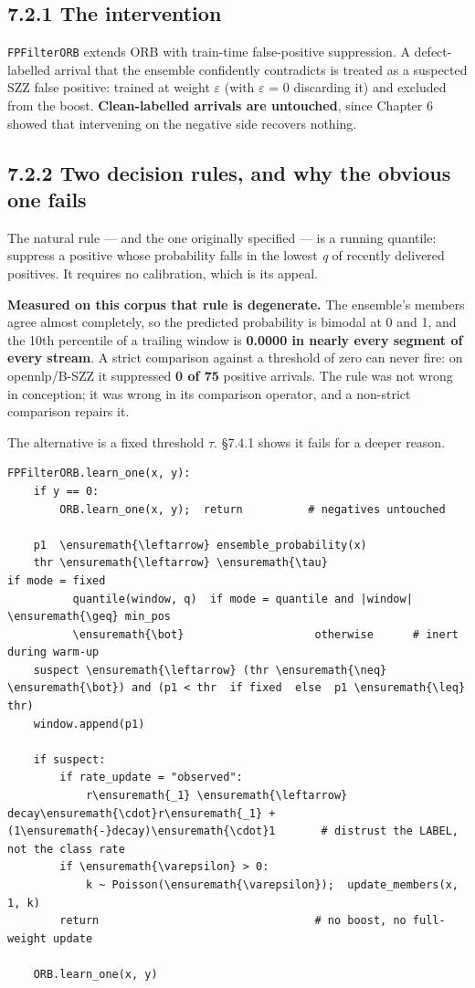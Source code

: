 \subsection{7.2.1 The intervention}\label{the-intervention}

\texttt{FPFilterORB} extends ORB with train-time false-positive
suppression. A defect-labelled arrival that the ensemble confidently
contradicts is treated as a suspected SZZ false positive: trained at
weight \ensuremath{\varepsilon} (with \ensuremath{\varepsilon} = 0 discarding it) and excluded from the boost.
\textbf{Clean-labelled arrivals are untouched}, since Chapter 6 showed
that intervening on the negative side recovers nothing.

\subsection{7.2.2 Two decision rules, and why the obvious one
fails}\label{two-decision-rules-and-why-the-obvious-one-fails}

The natural rule --- and the one originally specified --- is a running
quantile: suppress a positive whose probability falls in the lowest
\emph{q} of recently delivered positives. It requires no calibration,
which is its appeal.

\textbf{Measured on this corpus that rule is degenerate.} The ensemble's
members agree almost completely, so the predicted probability is bimodal
at 0 and 1, and the 10th percentile of a trailing window is
\textbf{0.0000 in nearly every segment of every stream}. A strict
comparison against a threshold of zero can never fire: on opennlp/B-SZZ
it suppressed \textbf{0 of 75} positive arrivals. The rule was not wrong
in conception; it was wrong in its comparison operator, and a non-strict
comparison repairs it.

The alternative is a fixed threshold \ensuremath{\tau}. \S{}7.4.1 shows it fails for a
deeper reason.

\begin{verbatim}
FPFilterORB.learn_one(x, y):
    if y == 0:
        ORB.learn_one(x, y);  return          # negatives untouched

    p1  \ensuremath{\leftarrow} ensemble_probability(x)
    thr \ensuremath{\leftarrow} \ensuremath{\tau}                    if mode = fixed
          quantile(window, q)  if mode = quantile and |window| \ensuremath{\geq} min_pos
          \ensuremath{\bot}                    otherwise      # inert during warm-up
    suspect \ensuremath{\leftarrow} (thr \ensuremath{\neq} \ensuremath{\bot}) and (p1 < thr  if fixed  else  p1 \ensuremath{\leq} thr)
    window.append(p1)

    if suspect:
        if rate_update = "observed":
            r\ensuremath{_1} \ensuremath{\leftarrow} decay\ensuremath{\cdot}r\ensuremath{_1} + (1\ensuremath{-}decay)\ensuremath{\cdot}1       # distrust the LABEL, not the class rate
        if \ensuremath{\varepsilon} > 0:
            k ~ Poisson(\ensuremath{\varepsilon});  update_members(x, 1, k)
        return                                 # no boost, no full-weight update

    ORB.learn_one(x, y)
\end{verbatim}

